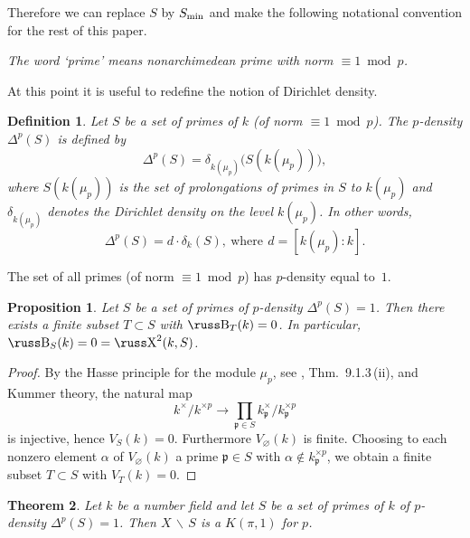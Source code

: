 \documentclass[10pt]{article}
\newcommand{\p}{{\mathfrak p}}
\newcommand{\sm}{{\,\smallsetminus\,}}
\newcommand{\lang}{\longrightarrow}
\renewcommand{\min}{\text{\rm min}}
\def\Sha{\hbox{\russ\char88}}
\def\Be{\hbox{\russ\char66}}
\theoremstyle{alex}
\newtheorem{theorem}{Theorem}[section]
\newtheorem{proposition}[theorem]{Proposition}
\theoremstyle{alexdef}
\newtheorem*{definition}{Definition}
\begin{document}
Therefore we can replace $S$ by  $S_\min$ and make the following notational convention for the rest of this paper.

\bigskip\noindent


\begin{minipage}{11cm}{\it  The word `prime' means nonarchimedean prime with norm $\equiv 1 \bmod p$.}
\end{minipage}


\bigskip\noindent
At this point it is useful to redefine the notion of Dirichlet density.

\begin{definition}
Let $S$ be a set of primes of $k$ (of norm $\equiv 1 \bmod p$). The $p$-density $\varDelta^p(S)$ is defined by
\[
\varDelta^p(S) = \delta_{k(\mu_p)}\big(S(k(\mu_p))\big),
\]
where $S(k(\mu_p))$ is the set of prolongations of primes in $S$ to $k(\mu_p)$ and $\delta_{k(\mu_p)}$ denotes the Dirichlet density on the level $k(\mu_p)$. In other words,
\[
\varDelta^p(S)= d\cdot \delta_k(S),\ \text{where}\ \, d=[k(\mu_p):k].
\]
\end{definition}
The set of all primes (of norm $\equiv 1 \bmod p$) has $p$-density equal to~$1$.


\begin{proposition}\label{sha2gleich0}
Let  $S$ be a set of primes of $p$-density $\varDelta^p(S)=1$.  Then there exists a finite subset $T\subset S$ with $\Be_T(k)=0$. In particular, $\Be_S(k)=0= \Sha^2(k,S)$.
\end{proposition}

\begin{proof}
By the Hasse principle for the module $\mu_p$, see \cite{NSW}, Thm.~9.1.3\,(ii), and Kummer theory, the natural map
\[
k^\times/k^{\times p} \lang \prod_{\p\in  S} k_\p^\times/k_\p^{\times p}
\]
is injective, hence $V_S(k)=0$. Furthermore $V_\varnothing(k)$ is finite. Choosing to each nonzero element $\alpha$ of $V_\varnothing(k)$ a prime $\p\in S$ with $\alpha\notin k_\p^{\times p}$, we obtain a finite subset $T\subset S$ with $V_T(k)=0$.
\end{proof}



\begin{theorem}\label{infinitekpi1} Let $k$ be a number field and
let $S$ be a set of primes of $k$ of $p$-density $\varDelta^p(S)=1$.  Then $X\sm S$ is a $K(\pi,1)$ for $p$.
\end{theorem}
\end{document}
